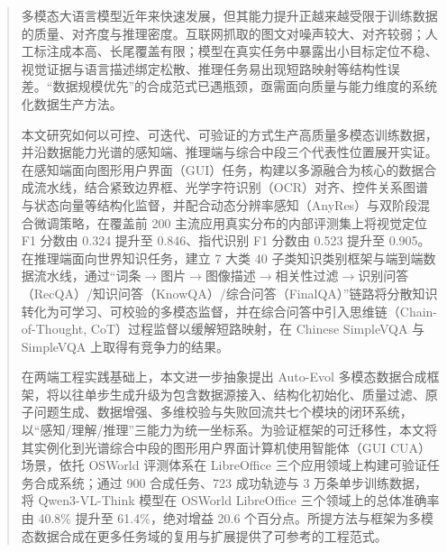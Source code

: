 \documentclass[type=master, twoside]{fduthesis}
\begin{document}
\raggedbottom

\frontmatter

\tableofcontents

\listoffigures

\listoftables

\begin{abstract}

多模态大语言模型近年来快速发展，但其能力提升正越来越受限于训练数据的质量、对齐度与推理密度。互联网抓取的图文对噪声较大、对齐较弱；人工标注成本高、长尾覆盖有限；模型在真实任务中暴露出小目标定位不稳、视觉证据与语言描述绑定松散、推理任务易出现短路映射等结构性误差。“数据规模优先”的合成范式已遇瓶颈，亟需面向质量与能力维度的系统化数据生产方法。

本文研究如何以可控、可迭代、可验证的方式生产高质量多模态训练数据，并沿数据能力光谱的感知端、推理端与综合中段三个代表性位置展开实证。在感知端面向图形用户界面（GUI）任务，构建以多源融合为核心的数据合成流水线，结合紧致边界框、光学字符识别（OCR）对齐、控件关系图谱与状态向量等结构化监督，并配合动态分辨率感知（AnyRes）与双阶段混合微调策略，在覆盖前 200 主流应用真实分布的内部评测集上将视觉定位 F1 分数由 0.324 提升至 0.846、指代识别 F1 分数由 0.523 提升至 0.905。在推理端面向世界知识任务，建立 7 大类 40 子类知识类别框架与端到端数据流水线，通过“词条$\rightarrow$图片$\rightarrow$图像描述$\rightarrow$相关性过滤$\rightarrow$识别问答（RecQA）/\allowbreak 知识问答（KnowQA）/\allowbreak 综合问答（FinalQA）”链路将分散知识转化为可学习、可校验的多模态监督，并在综合问答中引入思维链（Chain-of-Thought, CoT）过程监督以缓解短路映射，在 Chinese SimpleVQA 与 SimpleVQA 上取得有竞争力的结果。

在两端工程实践基础上，本文进一步抽象提出 Auto-Evol 多模态数据合成框架，将以往单步生成升级为包含数据源接入、结构化初始化、质量过滤、原子问题生成、数据增强、多维校验与失败回流共七个模块的闭环系统，以“感知/理解/推理”三能力为统一坐标系。为验证框架的可迁移性，本文将其实例化到光谱综合中段的图形用户界面计算机使用智能体（GUI CUA）场景，依托 OSWorld 评测体系在 LibreOffice 三个应用领域上构建可验证任务合成系统；通过 900 合成任务、723 成功轨迹与 3 万条单步训练数据，将 Qwen3-VL-Think 模型在 OSWorld LibreOffice 三个领域上的总体准确率由 40.8\% 提升至 61.4\%，绝对增益 20.6 个百分点。所提方法与框架为多模态数据合成在更多任务域的复用与扩展提供了可参考的工程范式。

\end{abstract}
\end{document}
